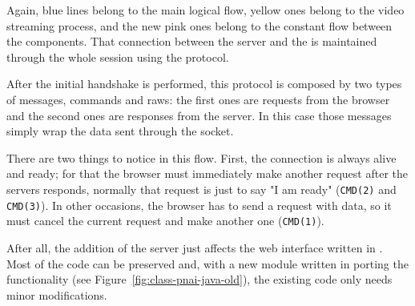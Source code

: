Again, blue lines belong to the main logical flow, yellow ones belong to the video streaming process, and the new pink ones belong to the constant flow between the  components.
That connection between the  server and the   is maintained through the whole session using the  protocol.

After the initial handshake is performed, this protocol is composed by two types of messages, commands and raws: the first ones are requests from the browser and the second ones are responses from the server.
In this case those messages simply wrap the data sent through the  socket.

There are two things to notice in this flow.
First, the connection is always alive and ready; for that the browser must immediately make another request after the servers responds, normally that request is just to say "I am ready" (\texttt{CMD(2)} and \texttt{CMD(3)}).
In other occasions, the browser has to send a request with data, so it must cancel the current request and make another one (\texttt{CMD(1)}).

After all, the addition of the  server just affects the web interface written in .
Most of the code can be preserved and, with a new module written in  porting the  functionality (see Figure~\vref{fig:class-pnai-java-old}), the existing code only needs minor modifications.

